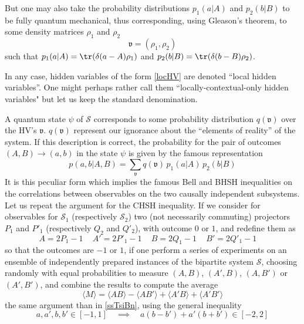 But one may also take the probability distributions $p_1(a|A)$ and $p_2(b|B)$ to be fully quantum mechanical, thus corresponding, using Gleason's theorem, to some density matrices $\rho_1$ and $\rho_2$ 
\begin{equation}
\label{ }
\mathfrak{v}=(\rho_1,\rho_2)
\end{equation} 
such that 
$p_1(a|A)=\tr(\delta(a-A)\rho_1)$ and $p_2(b|B)=\tr(\delta(b-B)\rho_2)$.

In any case,  hidden variables of the form \ref{locHV} are denoted ``local hidden variables''.
One might perhaps rather call them 
``locally-contextual-only hidden variables" 
but let us keep the standard denomination.

A quantum state $\psi$ of $\mathcal{S}$ corresponds to some probability distribution $q(\mathfrak{v})$ over the HV's $\mathfrak{v}$.
$q(\mathfrak{v})$ represent our ignorance about the ``elements of reality''  of the system.
If this description is correct, the probability for the pair of outcomes $(A,B)\to (a,b)$ in the state $\psi$ is given by the famous representation
\begin{equation}
\label{probABloc}
p(a,b|A,B)=\sum_{\mathfrak{v}} q(\mathfrak{v})\,p_1(a|A)\,p_2(b|B)
\end{equation}
It is this peculiar form which implies the famous Bell and BHSH inequalities on the correlations between observables on the two causally independent subsystems. Let us repeat the argument for the CHSH inequality.
If we consider for observables for $\mathcal{S}_1$ (respectively   $\mathcal{S}_2$) two (not necessarily commuting) projectors $P_1$ and $P'_1$ (respectively $Q_2$ and $Q'_2$), with outcome $0$ or $1$, and redefine them as
\begin{equation}
\label{ }
A=2 P_1-1\,\quad A'=2 P'_1-1\,\quad B=2 Q_1-1\,\quad B'=2 Q'_1-1\,\quad
\end{equation}
so that the outcomes are $-1$ or $1$,
if one perform a series of experiments on an ensemble of independently prepared instances of the bipartite system $\mathcal{S}$, choosing randomly with equal probabilities to measure $(A,B)$, $(A',B)$, $(A,B')$ or $(A',B')$, and combine the results to compute the average 
\begin{equation}
\label{ }
\langle M\rangle = \langle AB\rangle -\langle A B' \rangle +\langle  A' B\rangle  +\langle  A' B'\rangle 
\end{equation}
the same argument than in \ref{ssTsiBn}, using the general inequality
\begin{equation}
\label{ }
a,a',b,b'\in[-1,1] \quad\implies\quad a(b-b')+a'(b+b')\in[-2,2]
\end{equation}
